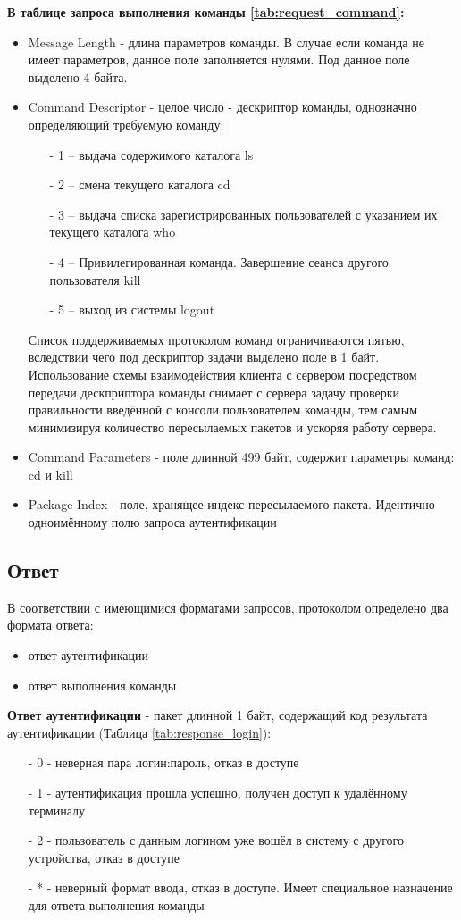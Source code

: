 \textbf{В таблице запроса выполнения команды \ref{tab:request_command}:}
\begin{itemize}
\item Message Length - длина параметров команды. В случае если команда не имеет параметров, данное поле заполняется нулями. Под данное поле выделено 4 байта.
\item Command Descriptor - целое число - дескриптор команды, однозначно определяющий требуемую команду:
\begin{itemize}
\item[-] 1 – выдача содержимого каталога ls
\item[-] 2 – смена текущего каталога cd
\item[-] 3 – выдача списка зарегистрированных пользователей с указанием их текущего каталога who
\item[-] 4 – Привилегированная команда. Завершение сеанса другого пользователя kill
\item[-] 5 – выход из системы logout
\end{itemize}
Список поддерживаемых протоколом команд ограничиваются пятью, вследствии чего под дескриптор задачи выделено поле в 1 байт. Использование схемы взаимодействия клиента с сервером посредством передачи дескприптора команды снимает с сервера задачу проверки правильности введённой с консоли пользователем команды, тем самым минимизируя количество пересылаемых пакетов и ускоряя работу сервера.

\item Command Parameters - поле длинной 499 байт, содержит параметры команд: cd и kill
\item Package Index - поле, хранящее индекс пересылаемого пакета. Идентично одноимённому полю запроса аутентификации
\end{itemize}

\subsection{Ответ}
В соответствии с имеющимися форматами запросов, протоколом определено два формата ответа:
\begin{itemize}
\item ответ аутентификации
\item ответ выполнения команды
\end{itemize}

\textbf{Ответ аутентификации} - пакет длинной 1 байт, содержащий код результата аутентификации (Таблица \ref{tab:response_login}):
\begin{itemize}
\item[-] 0 - неверная пара логин:пароль, отказ в доступе
\item[-] 1 - аутентификация прошла успешно, получен доступ к удалённому терминалу
\item[-] 2 - пользователь с данным логином уже вошёл в систему с другого устройства, отказ в доступе
\item[-] * - неверный формат ввода, отказ в доступе. Имеет специальное назначение для ответа выполнения команды
\end{itemize}

